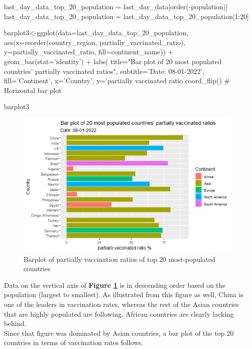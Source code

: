 \begin{Rcode}{\scriptsize}
last_day_data_top_20_population = last_day_data[order(-population)]
last_day_data_top_20_population = last_day_data_top_20_population[1:20]

barplot3<-ggplot(data=last_day_data_top_20_population,
                 aes(x=reorder(country_region, partially_vaccinated_ratio), 
                     y=partially_vaccinated_ratio, fill=continent_name)) +
  geom_bar(stat='identity') +
  labs(
    title="Bar plot of 20 most populated countries' partially vaccinated ratios",
    subtitle='Date: 08-01-2022', fill='Continent',
    x='Country', y='partially vaccinated ratio %
  coord_flip() # Horizontal bar plot

barplot3
\end{Rcode}


\begin{figure}[h]
    \centering
    \includegraphics[width=12cm]{figures/Barplot_top20_population.png}
    \caption{Barplot of partially vaccination ratios of top 20 most-populated countries}
    \label{fig:top_20_population}
\end{figure}

Data on the vertical axis of \textbf{Figure \ref{fig:top_20_population}} is in descending order based on the population (largest to smallest). As illustrated from this figure as well, China is one of the leaders in vaccination rates, whereas the rest of the Asian countries that are highly populated are following. African countries are clearly lacking behind.
\\
Since that figure was dominated by Asian countries, a bar plot of the top 20 countries in terms of vaccination rates follows.

